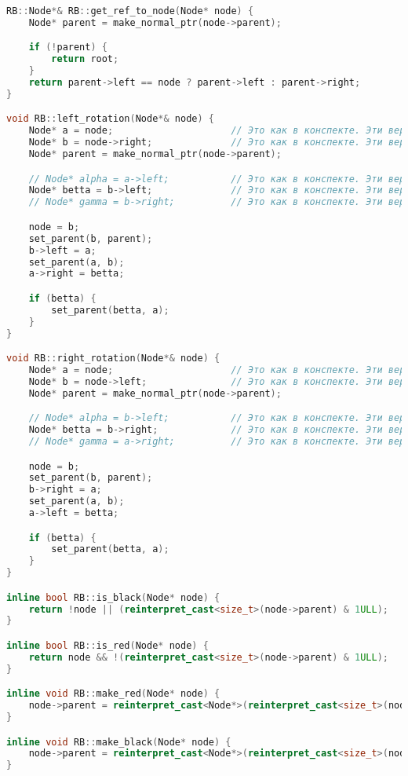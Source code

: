 \begin{lstlisting}[language=C++]
RB::Node*& RB::get_ref_to_node(Node* node) {
    Node* parent = make_normal_ptr(node->parent);

    if (!parent) {
        return root;
    }
    return parent->left == node ? parent->left : parent->right;
}

void RB::left_rotation(Node*& node) {
    Node* a = node;                     // Это как в конспекте. Эти вершины обязательно должны быть.
    Node* b = node->right;              // Это как в конспекте. Эти вершины обязательно должны быть.
    Node* parent = make_normal_ptr(node->parent);

    // Node* alpha = a->left;           // Это как в конспекте. Эти вершины могут не быть.
    Node* betta = b->left;              // Это как в конспекте. Эти вершины могут не быть.
    // Node* gamma = b->right;          // Это как в конспекте. Эти вершины могут не быть.

    node = b;
    set_parent(b, parent);
    b->left = a;
    set_parent(a, b);
    a->right = betta;

    if (betta) {
        set_parent(betta, a);
    }
}

void RB::right_rotation(Node*& node) {
    Node* a = node;                     // Это как в конспекте. Эти вершины обязательно должны быть.
    Node* b = node->left;               // Это как в конспекте. Эти вершины обязательно должны быть.
    Node* parent = make_normal_ptr(node->parent);

    // Node* alpha = b->left;           // Это как в конспекте. Эти вершины могут не быть.            
    Node* betta = b->right;             // Это как в конспекте. Эти вершины могут не быть.
    // Node* gamma = a->right;          // Это как в конспекте. Эти вершины могут не быть.

    node = b;
    set_parent(b, parent);
    b->right = a;
    set_parent(a, b);
    a->left = betta;

    if (betta) {
        set_parent(betta, a);
    }
}

inline bool RB::is_black(Node* node) {
    return !node || (reinterpret_cast<size_t>(node->parent) & 1ULL); 
}

inline bool RB::is_red(Node* node) {
    return node && !(reinterpret_cast<size_t>(node->parent) & 1ULL);
}

inline void RB::make_red(Node* node) {
    node->parent = reinterpret_cast<Node*>(reinterpret_cast<size_t>(node->parent) & (UINT64_MAX - 1));
}

inline void RB::make_black(Node* node) {
    node->parent = reinterpret_cast<Node*>(reinterpret_cast<size_t>(node->parent) | 1ULL);
}


\end{lstlisting}
